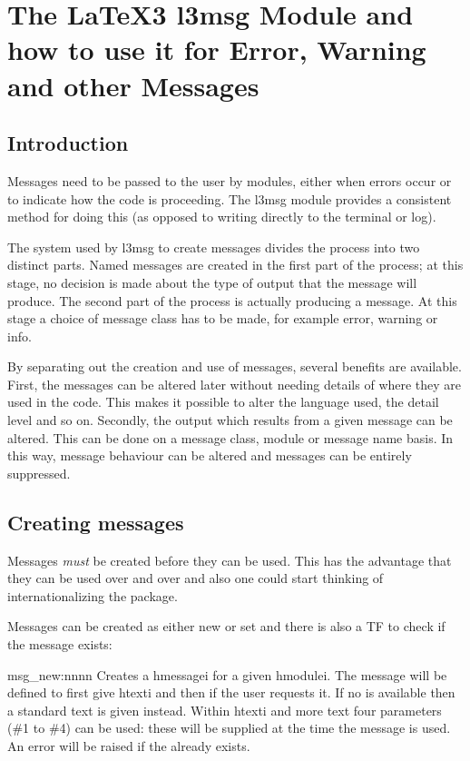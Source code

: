        
\chapter{The LaTeX3 l3msg Module and how to use it for Error, Warning and other Messages}
\section{Introduction}

Messages need to be passed to the user by modules, either when errors occur or to indicate
how the code is proceeding. The l3msg module provides a consistent method for doing
this (as opposed to writing directly to the terminal or log).

The system used by l3msg to create messages divides the process into two distinct
parts. Named messages are created in the first part of the process; at this stage, no
decision is made about the type of output that the message will produce. The second
part of the process is actually producing a message. At this stage a choice of message
class has to be made, for example error, warning or info.

By separating out the creation and use of messages, several benefits are available.
First, the messages can be altered later without needing details of where they are used
in the code. This makes it possible to alter the language used, the detail level and so
on. Secondly, the output which results from a given message can be altered. This can be
done on a message class, module or message name basis. In this way, message behaviour
can be altered and messages can be entirely suppressed.

\section{Creating messages}

Messages \emph{must} be created before they can be used. This has the advantage that they can be used
over and over and also one could start thinking of internationalizing the package.

Messages can be created as either new or set and there is also a TF to check if the message exists:

\begin{docCommand}{msg_new:nnnn}{     }
Creates a hmessagei for a given hmodulei. The message will be defined to first give htexti
and then  if the user requests it. If no  is available then a standard
text is given instead. Within htexti and more text four parameters (\#1 to \#4) can be
used: these will be supplied at the time the message is used. An error will be raised if
the  already exists.
\end{docCommand}

